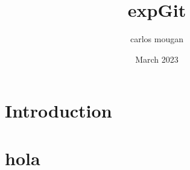\documentclass{article}
\title{expGit}
\author{carlos mougan }
\date{March 2023}
\begin{document}
\section{Introduction}
\section{hola}
\end{document}
